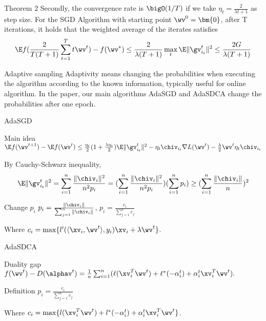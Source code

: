 \begin{frame}{Theorem 2}
Secondly, the convergence rate is $\bigO(1/T)$ if we take $\eta_t=\frac{2}{\lambda t+1}$ as step size. For the SGD Algorithm  with starting point $\wv^{0}=\bm{0}$, after T iterations, it holds that the weighted average of the iterates satisfies
\[
    \E f(\frac{2}{T(T+1)}\sum_{t=1}^{T}t \wv^{t}) - f(\wv^*) \le \frac{2}{\lambda(T+1)} \max_{t} \E\|\gv_{i_t}^{t}\|^2
    \le \frac{2G}{\lambda (T+1)}
\]
\end{frame}

\begin{frame}{Adaptive sampling}
Adaptivity means changing the probabilities when executing the algorithm according to the known information, typically useful for online algorithm.
In the paper, our main algorithms AdaSGD and AdaSDCA change the probabilities after one epoch.
\end{frame}

\begin{frame}{AdaSGD}
\begin{block}{Main idea}
    $\E f(\wv^{t+1}) - \E f(\wv^{t}) \le \frac{\eta_t}{2}(1+\frac{\lambda \eta_t}{2})\E\|\gv_{i_t}^{t}\|^2 - \eta_t\chiv_{i_t}\nabla L(\wv^{t}) - \frac{\lambda}{2} \wv^{t} \eta_t \chiv_{i_t}$
\end{block}
By Cauchy-Schwarz inequality, 
\[ 
    \E\|\gv_{i_t}^{t}\|^2 = \sum_{i=1}^n \frac{\|\chiv_i\|^2}{n^2p_i} = (\sum_{i=1}^n \frac{\|\chiv_i\|^2}{n^2p_i}) (\sum_{i=1}^n p_i) \ge (\sum_{i=1}^n \frac{\|\chiv_i\|}{n})^2
    \]

\begin{block}{Change $p_i$}
    $p_i = \frac{\|\chiv_i\|}{\sum_{j=1}^n \|\chiv_i\|}$, 
    $p_i = \frac{c_i}{\sum_{j=1}^n c_j}$
\end{block}
Where $c_i = \max\{l'(\langle \xv_i, \wv^t\rangle, y_i)\xv_i +\lambda \wv^t\}$.
\end{frame}

\begin{frame}{AdaSDCA}
\begin{block}{Duality gap}
    $f(\wv^{t})-D(\alphav^{t}) = \frac{1}{n} \sum_{i=1}^n(\ell(\xv_i^T\wv^{t})+\ell^*(-\alpha_i^{t})+\alpha_i^{t}\xv_i^T\wv^{t}).$
\end{block}

\begin{block}{Definition}
    $p_i = \frac{c_i}{\sum_{j=1}^n c_j}$
\end{block}
Where $c_i = \max\{l(\xv_i^T\wv^t)+l^*(-\alpha_i^t)+\alpha_i^t\xv_i^T\wv^t\}$.
\end{frame}


